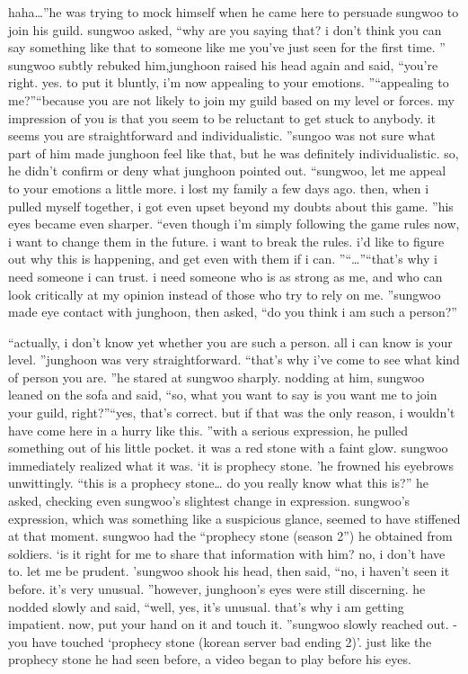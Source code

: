  haha…”he was trying to mock himself when he came here to persuade sungwoo to join his guild.
sungwoo asked, “why are you saying that? i don’t think you can say something like that to someone like me you’ve just seen for the first time.
” sungwoo subtly rebuked him,junghoon raised his head again and said, “you’re right.
 yes.
 to put it bluntly, i’m now appealing to your emotions.
”“appealing to me?”“because you are not likely to join my guild based on my level or forces.
 my impression of you is that you seem to be reluctant to get stuck to anybody.
 it seems you are straightforward and individualistic.
”sungoo was not sure what part of him made junghoon feel like that, but he was definitely individualistic.
 so, he didn’t confirm or deny what junghoon pointed out.
“sungwoo, let me appeal to your emotions a little more.
 i lost my family a few days ago.
 then, when i pulled myself together, i got even upset beyond my doubts about this game.
”his eyes became even sharper.
“even though i’m simply following the game rules now, i want to change them in the future.
 i want to break the rules.
 i’d like to figure out why this is happening, and get even with them if i can.
”“…”“that’s why i need someone i can trust.
 i need someone who is as strong as me, and who can look critically at my opinion instead of those who try to rely on me.
”sungwoo made eye contact with junghoon, then asked, “do you think i am such a person?”

“actually, i don’t know yet whether you are such a person.
 all i can know is your level.
”junghoon was very straightforward.
“that’s why i’ve come to see what kind of person you are.
”he stared at sungwoo sharply.
nodding at him, sungwoo leaned on the sofa and said, “so, what you want to say is you want me to join your guild, right?”“yes, that’s correct.
 but if that was the only reason, i wouldn’t have come here in a hurry like this.
”with a serious expression, he pulled something out of his little pocket.
 it was a red stone with a faint glow.
sungwoo immediately realized what it was.
 ‘it is prophecy stone.
’he frowned his eyebrows unwittingly.
“this is a prophecy stone… do you really know what this is?” he asked, checking even sungwoo’s slightest change in expression.
 sungwoo’s expression, which was something like a suspicious glance, seemed to have stiffened at that moment.
sungwoo had the “prophecy stone (season 2”) he obtained from soldiers.
‘is it right for me to share that information with him? no, i don’t have to.
 let me be prudent.
’sungwoo shook his head, then said, “no, i haven’t seen it before.
 it’s very unusual.
”however, junghoon’s eyes were still discerning.
he nodded slowly and said, “well, yes, it’s unusual.
 that’s why i am getting impatient.
 now, put your hand on it and touch it.
”sungwoo slowly reached out.
-you have touched ‘prophecy stone (korean server bad ending 2)’.
just like the prophecy stone he had seen before, a video began to play before his eyes.


 